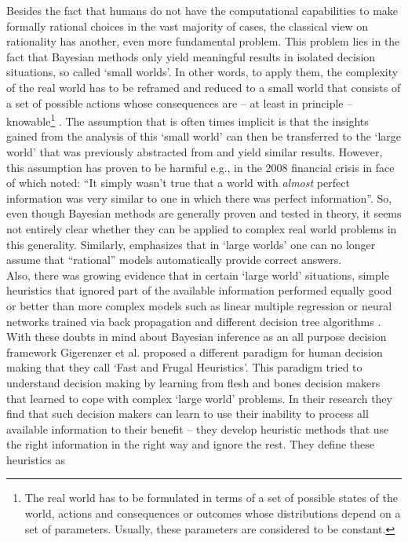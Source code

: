 Besides the fact that humans do not have the computational capabilities to make formally rational choices in the vast majority of cases, the classical view on rationality has another, even more fundamental problem. This problem lies in the fact that Bayesian methods only yield meaningful results in isolated decision situations, so called `small worlds'. In other words, to apply them, the complexity of the real world has to be reframed and reduced to a small world that consists of a set of possible actions whose consequences are -- at least in principle -- knowable\footnote{The real world has to be formulated in terms of a set of possible states of the world, actions and consequences or outcomes whose distributions depend on a set of parameters. Usually, these parameters are considered to be constant.} \citep[for an elaboration see p. 82 ff.][]{savage1972foundations}. The assumption that is often times implicit is that the insights gained from the analysis of this `small world' can then be transferred to the `large world' that was previously abstracted from and yield similar results. However, this assumption has proven to be harmful e.g., in the 2008 financial crisis in face of which \cite{Stiglitz2010} noted: ``It simply wasn't true that a world with \emph{almost} perfect information was very similar to one in which there was perfect information''. So, even though Bayesian methods are generally proven and tested in theory, it seems not entirely clear whether they can be applied to complex real world problems in this generality.
Similarly, \cite{binmore2008rational} emphasizes that in `large worlds' one can no longer assume that ``rational'' models automatically provide correct answers.\\
Also, there was growing evidence that in certain `large world' situations, simple heuristics that ignored part of the available information performed equally good or better than more complex models such as linear multiple regression \citep{Czerlinski1999} or neural networks trained via back propagation and different decision tree algorithms \citep{Chater2003, Brighton2006}.\\

With these doubts in mind about Bayesian inference as an all purpose decision framework Gigerenzer et al. proposed a different paradigm for human decision making that they call `Fast and Frugal Heuristics'. 
This paradigm tried to understand decision making by learning from flesh and bones decision makers that learned to cope with complex `large world' problems. In their research they find that such decision makers can learn to use their inability to process all available information to their benefit -- they develop heuristic methods that use the right information in the right way and ignore the rest. They define these heuristics as
\\

